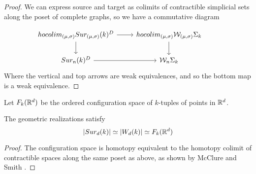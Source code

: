 \begin{proof}
We can express source and target as colimits of contractible %
simplicial sets along the poset of complete graphs, 
so we have a commutative diagram

	\begin{equation*}
		\begin{tikzcd}
			hocolim_{(\mu,\sigma)}Sur_{(\mu,\sigma)}(k)^{D} \arrow[r] \arrow[d]& hocolim_{(\mu,\sigma)}\mathcal{W}_{(\mu,\sigma)}\Sigma_{k} \arrow[d] \\
			Sur_{n}(k)^{D}\arrow[r] & \mathcal{W}_{n}\Sigma_{k}& 
		\end{tikzcd}
	\end{equation*}
	Where the vertical and top arrows
	are weak equivalences, and so the bottom map is a weak equivalence.
	
\end{proof}

Let  $F_k(\mathbb{R}^{d})$ be the ordered configuration space of $k$-tuples of points in  $\mathbb{R}^{d}$. 

\begin{proposition}
The geometric realizations satisfy 
$$|Sur_d(k)| \simeq |W_d(k)|  \simeq F_k(\mathbb{R}^{d})$$
\end{proposition}

\begin{proof}
The configuration space is homotopy equivalent to the homotopy colimit of contractible spaces along the same poset as above, as shown by McClure and Smith \cite{MS}. %
\end{proof}